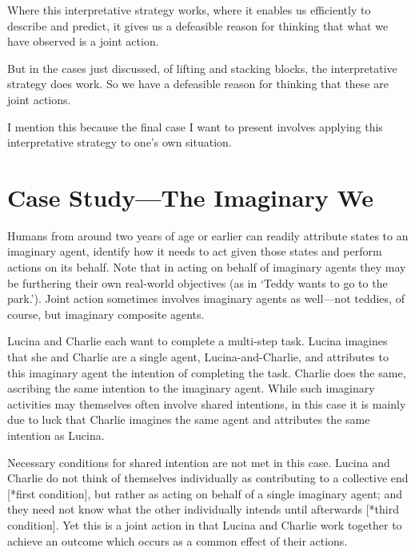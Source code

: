 \documentclass[12pt,a4paper]{extarticle}
\begin{document}
Where this interpretative strategy works, where it enables us efficiently to describe and predict, it gives us a defeasible reason for thinking that what we have observed is a joint action.

But in the cases just discussed, of lifting and stacking blocks, the interpretative strategy does work.  So we have a defeasible reason for thinking that these are joint actions.

I mention this because the final case I want to present involves applying this interpretative strategy to one's own situation.


\section{Case Study---The Imaginary We}

Humans from around two years of age or earlier can readily attribute states to an imaginary agent, identify how it needs to act given those states and perform actions on its behalf.  Note that in acting on behalf of imaginary agents they may be furthering their own real-world objectives (as in `Teddy wants to go to the park.'). 
Joint action sometimes involves imaginary agents as well---not teddies, of course, but imaginary composite agents.  

Lucina and Charlie each want to complete a multi-step task.  Lucina imagines that she and Charlie are a single agent, Lucina-and-Charlie, and attributes to this imaginary agent the intention of completing the task.  Charlie does the same, ascribing the same intention to the imaginary agent.  While such imaginary activities may themselves often involve shared intentions, in this case it is mainly due to luck that Charlie imagines the same agent and attributes the same intention as Lucina.

Necessary conditions for shared intention are not met in this case. Lucina and Charlie do not think of themselves individually as contributing to a collective end [*first condition], but rather as acting on behalf of a single imaginary agent; and they need not know what the other individually intends until afterwards [*third condition].  Yet this is a joint action in that Lucina and Charlie work together to achieve an outcome which occurs as a common effect of their actions.  
\end{document}
